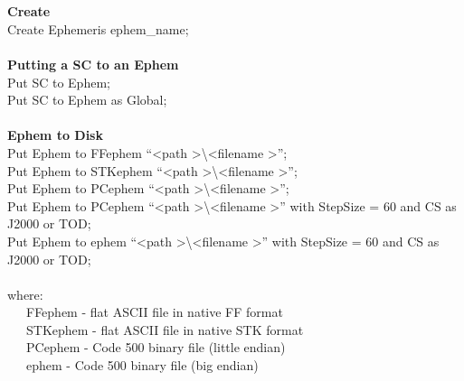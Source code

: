 \documentclass[10pt]{article}
\begin{document}
\begin{textblock*}{101.65mm}
\begin{tabular*}{97.15 mm}{|lll|}
\hline
\end{tabular*}\\
\\
\textbf{Create}\\
Create Ephemeris ephem\_name;\\
\\
\textbf{Putting a SC to an Ephem}\\
Put SC to Ephem;\\
Put SC to Ephem as Global;\\
\\
\textbf{Ephem to Disk}\\
Put Ephem to FFephem  ``\textless path \textgreater \textbackslash \textless filename \textgreater'';\\
Put Ephem to STKephem ``\textless path \textgreater \textbackslash \textless filename \textgreater'';\\
Put Ephem to PCephem  ``\textless path \textgreater \textbackslash \textless filename \textgreater'';\\
Put Ephem to PCephem  ``\textless path \textgreater \textbackslash \textless filename \textgreater'' with StepSize = 60 and CS as J2000 or TOD;\\
Put Ephem to ephem    ``\textless path \textgreater \textbackslash \textless filename \textgreater'' with StepSize = 60 and CS as J2000 or TOD;\\
\\
where:\\
~~~FFephem - flat ASCII file in native FF format\\
~~~STKephem - flat ASCII file in native STK format\\
~~~PCephem - Code 500 binary file (little endian)\\
~~~ephem   - Code 500 binary file (big endian)\\
\end{textblock*}
\end{document}
